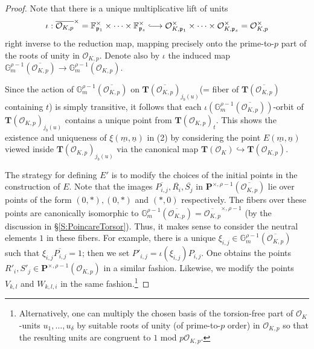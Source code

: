 \documentclass[11pt,oneside]{amsart}
\theoremstyle{plain}
\theoremstyle{definition}
\def\G{{\bf G}}
\def\TT{\mathbf{T}}
\def\G{\mathbb{G}}
\def\P{\mathbf{P}}
\def\oh{\mathcal{O}}
\def\longhookrightarrow{\lhook\joinrel\longrightarrow}
\begin{document}
\begin{proof}
Note that there is a unique multiplicative lift of units 
$$\iota:{\overline{\oh_{K, p}}^{\times} = \mathbb{F}_{\mathfrak{p}_1}^\times \times \dots \times \mathbb{F}_{\mathfrak{p}_s}^\times \longhookrightarrow \oh_{K, \mathfrak{p}_1}^\times\times \dots \times \oh_{K, \mathfrak{p}_s}^\times=\oh_{K, p}^{\times}}$$
right inverse to the reduction map, mapping precisely onto the prime-to-$p$ part of the roots of unity in $\oh_{K, p}$. 
Denote also by $\iota$ the induced map $\G_m^{\rho-1}(\overline{\oh_{K, p}})\rightarrow \G_m^{\rho-1}(\oh_{K, p})$. %

Since the action of $\G_m^{\rho-1}(\overline{\oh_{K, p}})$ on $\TT(\overline{\oh_{K, p}})_{j_b(u)}$(= fiber of ${\TT(\overline{\oh_{K, p}})}$ containing $t$) is simply transitive, it follows that each $\iota(\G_m^{\rho-1}(\overline{\oh_{K, p}}))$-orbit of $\TT(\oh_{K, p})_{j_b(u)}$ contains a unique point from $\TT(\oh_{K, p})_t$. This shows the existence and uniqueness of $\xi(\underline{m}, \underline{n})$ in (2) by considering the point $E(\underline{m}, \underline{n})$ viewed inside  $\TT(\oh_{K, p})_{j_b(u)}$ via the canonical map ${\TT(\oh_K) \hookrightarrow \TT(\oh_{K, p})}$. 

The strategy for defining $E'$ is to modify the choices of the initial points in the construction of $E$. Note that the images $\overline{P_{i, j}}, \overline{R_i}, \overline{S_j}$ in ${\P^{\times, \rho-1}(\overline{\oh_{K, p}})}$ lie over points of the form $(0, *), (0, *)$ and $(*, 0)$ respectively. The fibers over these points are canonically isomorphic to $\G_m^{\rho-1}(\overline{\oh_{K, p}})=\overline{\oh_{K, p}}^{\times, \rho-1}$ (by the discussion in \S \ref{S:PoincareTorsor}). Thus, it makes sense to consider the neutral elements $1$ in these fibers. For example, there is a unique $\xi_{i, j} \in \G_m^{\rho-1}(\overline{\oh_{K, p}})$  such that $\xi_{i, j}\overline{P_{i, j}}=1$; then we set $P'_{i, j}=\iota(\xi_{i, j})P_{i, j}.$ One obtains the points $R'_i, S'_j \in \P^{\times, \rho-1}(\oh_{K, p})$ in a similar fashion. Likewise, we modify the points $V_{k, l}$ and $W_{k, l, i}$ in the same fashion.\footnote{Alternatively, one can multiply the chosen basis of the torsion-free part of $\oh_K$-units $u_1, \dots, u_{\delta}$ by suitable roots of unity (of prime-to-$p$ order) in $\oh_{K, p}$ so that the resulting units are congruent to $1$ mod $p\oh_{K, p}$. }


\end{proof}
\end{document}
